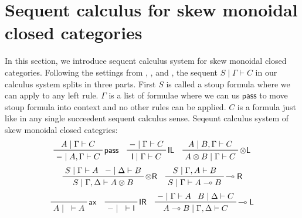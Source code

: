 \documentclass{article}
\newcommand{\pass}{\mathsf{pass}}
\begin{document}
\section{Sequent calculus for skew monoidal closed categories}
In this section, we introduce sequent calculus system for skew monoidal closed categories.
Following the settings from \cite{uustalu_sequent_2018}, \cite{uustalu_deductive_nodate}, and \cite{uustalu_proof_nodate}, the sequent $S \mid \Gamma \vdash C$ in our calculus system splits in three parts.
First $S$ is called a stoup formula where we can apply to any left rule.
$\Gamma$ is a list of formulae where we can us $\pass$ to move stoup formula into context and no other rules can be applied.
$C$ is a formula just like in any single succeedent sequent calculus sense.
Seqeunt calculus system of skew monoidal closed categries:
\begin{displaymath}
  \prftree[r]{$\mathsf{pass}$}
  {
  A\mid \Gamma \vdash C
  }
  {
  -\mid A, \Gamma \vdash C
  }
  \quad
  \prftree[r]{$\mathsf{IL}$}
  {
  -\mid \Gamma \vdash C
  }
  {
  \mathsf{I} \mid \Gamma \vdash C
  }
  \quad
  \prftree[r]{$\otimes \mathsf{L}$}
  {
  A\mid B, \Gamma \vdash C
  }
  {
  A\otimes B\mid \Gamma \vdash C
  }
\end{displaymath}
\begin{displaymath}
  \prftree[r]{$\otimes \mathsf{R}$}
  {
  S\mid \Gamma \vdash A
  }
  {
  -\mid \Delta \vdash B
  }
  {
  S\mid \Gamma , \Delta \vdash A\otimes B
  }
  \quad
  \prftree[r]{$\multimap \mathsf{R}$}
  {
  S\mid \Gamma ,A \vdash B
  }
  {
  S\mid \Gamma \vdash A\multimap B
  }
\end{displaymath}
\begin{displaymath}
  \prftree[r]{$\mathsf{ax}$}
  {
  A\mid \text{ } \vdash A
  }
  \quad
  \prftree[r]{$\mathsf{IR}$}
  {}
  {
  -\mid \text{ } \vdash \mathsf{I}
  }
  \quad
  \prftree[r]{$\multimap \mathsf{L}$}
  {
  -\mid \Gamma \vdash A
  }
  {
  B\mid \Delta \vdash C
  }
  {
  A\multimap B \mid \Gamma , \Delta \vdash C
  }
\end{displaymath}
\end{document}

